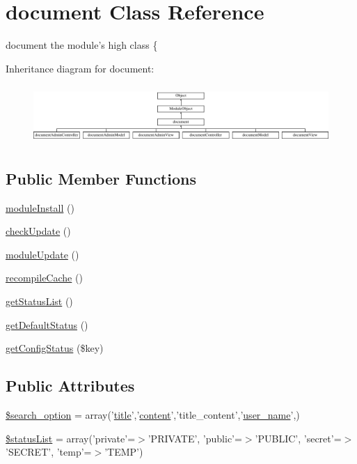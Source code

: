 \hypertarget{classdocument}{\section{document Class Reference}
\label{classdocument}
}


document the module's high class \{  


Inheritance diagram for document\-:\begin{figure}[H]
\begin{center}
\leavevmode
\includegraphics[height=2.262626cm]{classdocument}
\end{center}
\end{figure}
\subsection*{Public Member Functions}
\begin{DoxyCompactItemize}
\item 
\hyperlink{classdocument_a712db6c7542d0ec2cfdde35583a3b7ba}{module\-Install} ()
\item 
\hyperlink{classdocument_a71d01592758989490b56cbd6a2a92e37}{check\-Update} ()
\item 
\hyperlink{classdocument_ad0568fe26b80e3bc328a3fae4997354c}{module\-Update} ()
\item 
\hyperlink{classdocument_ae08854265fa7f6cb8b792d5c1ab93dc2}{recompile\-Cache} ()
\item 
\hyperlink{classdocument_ae90cc64e28afdfa204844ed6d03b40e7}{get\-Status\-List} ()
\item 
\hyperlink{classdocument_aacc6b168cae9bf79d7a13d6f5bb4fdfb}{get\-Default\-Status} ()
\item 
\hyperlink{classdocument_a319eeb35de3ffef5cb32374283b7bf14}{get\-Config\-Status} (\$key)
\end{DoxyCompactItemize}
\subsection*{Public Attributes}
\begin{DoxyCompactItemize}
\item 
\hyperlink{classdocument_adfef00d8f028ef4dfe991de199009d46}{\$search\-\_\-option} = array('\hyperlink{ko_8install_8php_a5b072c5fd1d2228c6ba5cee13cd142e3}{title}','\hyperlink{classcontent}{content}','title\-\_\-content','\hyperlink{ko_8install_8php_a115401aff7da80e73c66e9f76505426b}{user\-\_\-name}',)
\item 
\hyperlink{classdocument_a93e1c85a4ec17a1471b874fdb14cce58}{\$status\-List} = array('private'=$>$'P\-R\-I\-V\-A\-T\-E', 'public'=$>$'P\-U\-B\-L\-I\-C', 'secret'=$>$'S\-E\-C\-R\-E\-T', 'temp'=$>$'T\-E\-M\-P')
\end{DoxyCompactItemize}


